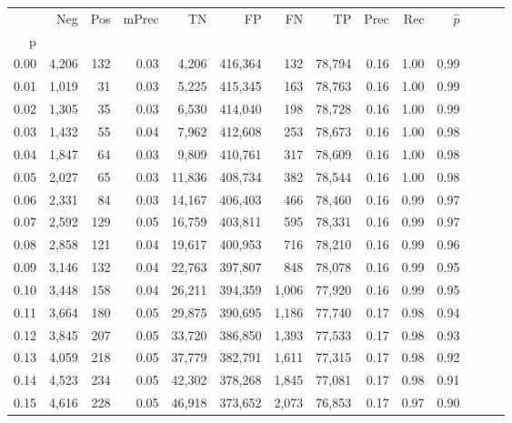 \begin{tabular}{rrrrrrrrrrrrrr}
\toprule
{} &    Neg &    Pos & mPrec &       TN &       FP &      FN &      TP &  Prec &   Rec & $\hat{p}$ \\
p    &        &        &       &          &          &         &         &       &       &           \\
\midrule
0.00 &  4,206 &    132 &  0.03 &    4,206 &  416,364 &     132 &  78,794 &  0.16 &  1.00 &      0.99 \\
0.01 &  1,019 &     31 &  0.03 &    5,225 &  415,345 &     163 &  78,763 &  0.16 &  1.00 &      0.99 \\
0.02 &  1,305 &     35 &  0.03 &    6,530 &  414,040 &     198 &  78,728 &  0.16 &  1.00 &      0.99 \\
0.03 &  1,432 &     55 &  0.04 &    7,962 &  412,608 &     253 &  78,673 &  0.16 &  1.00 &      0.98 \\
0.04 &  1,847 &     64 &  0.03 &    9,809 &  410,761 &     317 &  78,609 &  0.16 &  1.00 &      0.98 \\
0.05 &  2,027 &     65 &  0.03 &   11,836 &  408,734 &     382 &  78,544 &  0.16 &  1.00 &      0.98 \\
0.06 &  2,331 &     84 &  0.03 &   14,167 &  406,403 &     466 &  78,460 &  0.16 &  0.99 &      0.97 \\
0.07 &  2,592 &    129 &  0.05 &   16,759 &  403,811 &     595 &  78,331 &  0.16 &  0.99 &      0.97 \\
0.08 &  2,858 &    121 &  0.04 &   19,617 &  400,953 &     716 &  78,210 &  0.16 &  0.99 &      0.96 \\
0.09 &  3,146 &    132 &  0.04 &   22,763 &  397,807 &     848 &  78,078 &  0.16 &  0.99 &      0.95 \\
0.10 &  3,448 &    158 &  0.04 &   26,211 &  394,359 &   1,006 &  77,920 &  0.16 &  0.99 &      0.95 \\
0.11 &  3,664 &    180 &  0.05 &   29,875 &  390,695 &   1,186 &  77,740 &  0.17 &  0.98 &      0.94 \\
0.12 &  3,845 &    207 &  0.05 &   33,720 &  386,850 &   1,393 &  77,533 &  0.17 &  0.98 &      0.93 \\
0.13 &  4,059 &    218 &  0.05 &   37,779 &  382,791 &   1,611 &  77,315 &  0.17 &  0.98 &      0.92 \\
0.14 &  4,523 &    234 &  0.05 &   42,302 &  378,268 &   1,845 &  77,081 &  0.17 &  0.98 &      0.91 \\
0.15 &  4,616 &    228 &  0.05 &   46,918 &  373,652 &   2,073 &  76,853 &  0.17 &  0.97 &      0.90 \\

\end{tabular}
